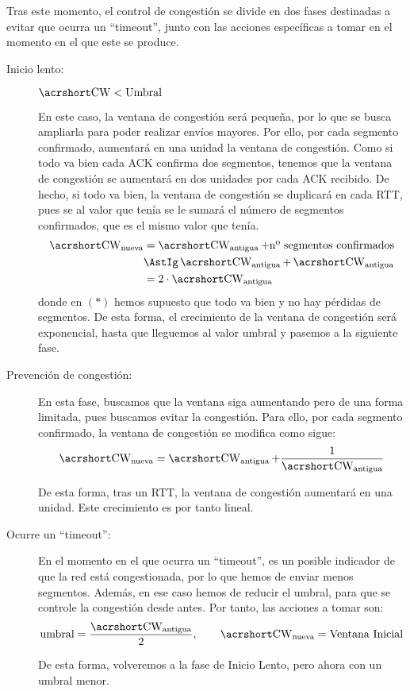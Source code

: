 Tras este momento, el control de congestión se divide en dos fases destinadas a evitar que ocurra un ``timeout'', junto con las acciones específicas a tomar en el momento en el que este se produce.
\begin{description}
    \item [Inicio lento:] $\cw < \text{Umbral}$
    
    En este caso, la ventana de congestión será pequeña, por lo que se busca ampliarla para poder realizar envíos mayores. Por ello, por cada segmento confirmado, aumentará en una unidad la ventana de congestión. Como si todo va bien cada \acrshort{ACK} confirma dos segmentos, tenemos que la ventana de congestión se aumentará en dos unidades por cada \acrshort{ACK} recibido. De hecho, si todo va bien, la ventana de congestión se duplicará en cada \acrshort{RTT}, pues se al valor que tenía se le sumará el número de segmentos confirmados, que es el mismo valor que tenía.
    \begin{align*}
        \cw_{\text{nueva}} &= \cw_{\text{antigua}} + \text{nº segmentos confirmados} \\
            &\AstIg \cw_{\text{antigua}} + \cw_{\text{antigua}}\\
            &= 2 \cdot \cw_{\text{antigua}}
    \end{align*}
    donde en $(\ast)$ hemos supuesto que todo va bien y no hay pérdidas de segmentos. De esta forma, el crecimiento de la ventana de congestión será exponencial, hasta que lleguemos al valor umbral y pasemos a la siguiente fase.

    \item [Prevención de congestión:] En esta fase, buscamos que la ventana siga aumentando pero de una forma limitada, pues buscamos evitar la congestión. Para ello, por cada segmento confirmado, la ventana de congestión se modifica como sigue:
    \begin{equation*}
        \cw_{\text{nueva}} = \cw_{\text{antigua}} + \frac{1}{\cw_{\text{antigua}}}
    \end{equation*}

    De esta forma, tras un \acrshort{RTT}, la ventana de congestión aumentará en una unidad. Este crecimiento es por tanto lineal.


    \item [Ocurre un ``timeout'':] En el momento en el que ocurra un ``timeout'', es un posible indicador de que la red está congestionada, por lo que hemos de enviar menos segmentos. Además, en ese caso hemos de reducir el umbral, para que se controle la congestión desde antes. Por tanto, las acciones a tomar son:
    \begin{equation*}
        \text{umbral} = \frac{\cw_{\text{antigua}}}{2}, \qquad \cw_{\text{nueva}} = \text{Ventana Inicial}
    \end{equation*}

    De esta forma, volveremos a la fase de Inicio Lento, pero ahora con un umbral menor.
\end{description}

